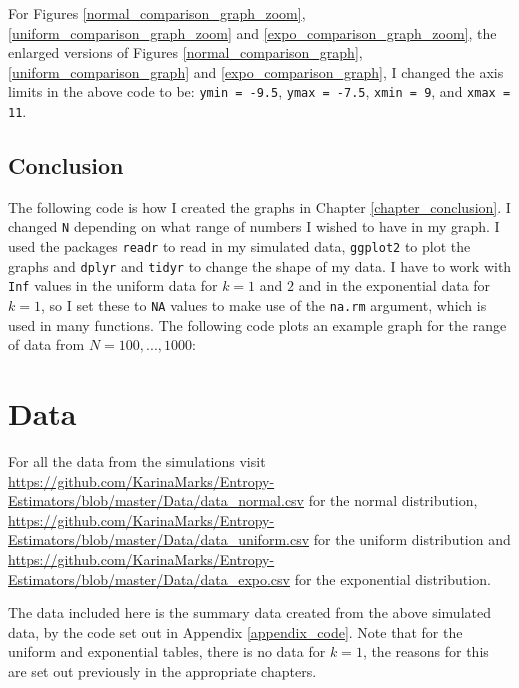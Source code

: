 \documentclass[12pt]{report}
\begin{document}
\begin{appendix}


For Figures \ref{normal_comparison_graph_zoom}, \ref{uniform_comparison_graph_zoom} and \ref{expo_comparison_graph_zoom}, the enlarged versions of Figures \ref{normal_comparison_graph}, \ref{uniform_comparison_graph} and \ref{expo_comparison_graph}, I changed the axis limits in the above code to be: \texttt{ymin = -9.5}, \texttt{ymax = -7.5}, \texttt{xmin = 9}, and \texttt{xmax = 11}.



\section{Conclusion}

The following code is how I created the graphs in Chapter \ref{chapter_conclusion}. I changed \texttt{N} depending on what range of numbers I wished to have in my graph. I used the packages \texttt{readr} to read in my simulated data, \texttt{ggplot2} to plot the graphs and \texttt{dplyr} and \texttt{tidyr} to change the shape of my data. I have to work with \texttt{Inf} values in the uniform data for $k=1$ and $2$ and in the exponential data for $k=1$, so I set these to \texttt{NA} values to make use of the \texttt{na.rm} argument, which is used in many functions. The following code plots an example graph for the range of data from $N=100,..., 1000$:






\chapter{Data} \label{appendix_data}

For all the data from the simulations visit \url{https://github.com/KarinaMarks/Entropy-Estimators/blob/master/Data/data_normal.csv} for the normal distribution, \url{https://github.com/KarinaMarks/Entropy-Estimators/blob/master/Data/data_uniform.csv} for the uniform distribution and \url{https://github.com/KarinaMarks/Entropy-Estimators/blob/master/Data/data_expo.csv} for the exponential distribution. %

The data included here is the summary data created from the above simulated data, by the code set out in Appendix \ref{appendix_code}. Note that for the uniform and exponential tables, there is no data for $k=1$, the reasons for this are set out previously in the appropriate chapters.


\end{appendix}
\end{document}
